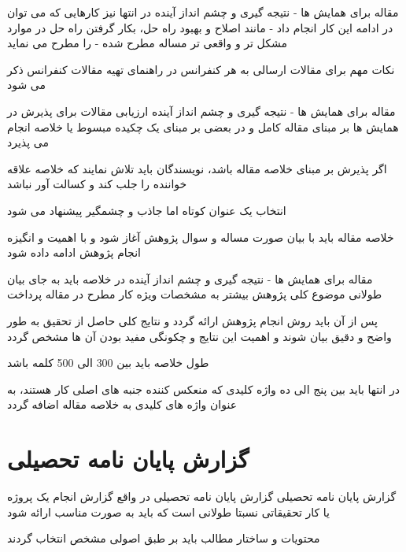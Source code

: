\documentclass[14pt]{beamer}
\newcommand{\sectionfontsize}{\fontsize{22pt}{0pt}\selectfont}
\newcommand{\framefontsizelarge}{\fontsize{18pt}{0pt}\selectfont}
\newcommand{\frametitlefontsize}{\fontsize{20pt}{0pt}\selectfont}
\begin{document}
\begin{persian}
\begin{frame}[plain]{\frametitlefontsize مقاله برای همایش ها - نتیجه گیری و چشم انداز آینده}
		در انتها نیز کارهایی که می توان در ادامه این کار انجام داد - مانند اصلاح و بهبود راه حل، بکار گرفتن راه حل در موارد مشکل تر و واقعی تر مساله مطرح شده - را مطرح می نماید
		
		نکات مهم برای مقالات ارسالی به هر کنفرانس در راهنمای تهیه مقالات کنفرانس ذکر می شود
	\end{frame}	
	
	\begin{frame}[plain]{\frametitlefontsize مقاله برای همایش ها - نتیجه گیری و چشم انداز آینده}
		\framefontsizelarge
		ارزیابی مقالات برای پذیرش در همایش ها بر مبنای مقاله کامل و در بعضی بر مبنای یک چکیده مبسوط یا خلاصه انجام می پذیرد
		
		اگر پذیرش بر مبنای خلاصه مقاله باشد، نویسندگان باید تلاش نمایند که خلاصه علاقه خواننده را جلب کند و کسالت آور نباشد
		
		انتخاب یک عنوان کوتاه اما جاذب و چشمگیر پیشنهاد می شود
		
		خلاصه مقاله باید با بیان صورت مساله و سوال پژوهش آغاز شود و با اهمیت و انگیزه انجام پژوهش ادامه داده شود
	\end{frame}	
	
	\begin{frame}[plain]{\frametitlefontsize مقاله برای همایش ها - نتیجه گیری و چشم انداز آینده}
		\framefontsizelarge
		در خلاصه باید به جای بیان طولانی موضوع کلی پژوهش بیشتر به مشخصات ویژه کار مطرح در مقاله پرداخت
		
		پس از آن باید روش انجام پژوهش ارائه گردد و نتایج کلی حاصل از تحقیق به طور واضح و دقیق بیان شوند و اهمیت این نتایج و چکونگی مفید بودن آن ها مشخص گردد
		
		طول خلاصه باید بین 300 الی 500 کلمه باشد
		
		در انتها باید بین پنج الی ده واژه کلیدی که منعکس کننده جنبه های اصلی کار هستند، به عنوان واژه های کلیدی به خلاصه مقاله اضافه گردد
	\end{frame}	
	
	\section{\sectionfontsize گزارش پایان نامه تحصیلی}	
	
	\begin{frame}[plain]{\frametitlefontsize گزارش پایان نامه تحصیلی}
		\framefontsizelarge
		گزارش پایان نامه تحصیلی در واقع گزارش انجام یک پروژه یا کار تحقیقاتی نسبتا طولانی است که باید به صورت مناسب ارائه شود
		
		محتویات و ساختار مطالب باید بر طبق اصولی مشخص انتخاب گردند
		

\end{frame}
\end{persian}
\end{document}
